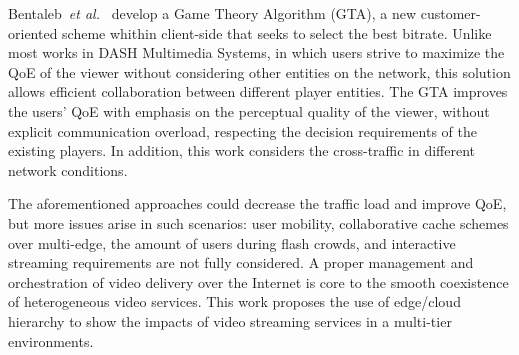 Bentaleb~\textit{et al.}~\cite{bentaleb:2018:MSys} develop a Game Theory Algorithm (GTA), a new customer-oriented scheme whithin client-side that seeks to select the best bitrate. Unlike most works in DASH Multimedia Systems, in which users strive to maximize the QoE of the viewer without considering other entities on the network, this solution allows efficient collaboration between different player entities. The GTA improves the users' QoE with emphasis on the perceptual quality of the viewer, without explicit communication overload, respecting the decision requirements of the existing players. In addition, this work considers the cross-traffic in different network conditions.

The aforementioned approaches could decrease the traffic load and improve QoE, but more issues arise in such scenarios: user mobility, collaborative cache schemes over multi-edge, the amount of users during flash crowds, and interactive streaming requirements are not fully considered.  A proper management and orchestration of video delivery over the Internet is core to the smooth coexistence of heterogeneous video services. This work proposes the use of edge/cloud hierarchy to show the impacts of video streaming services in a multi-tier environments.

%
%
